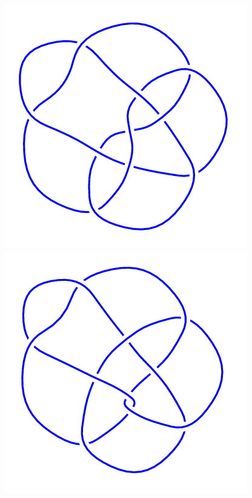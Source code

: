 \begin{figure}[H]
\begin{minipage}[b]{.18\linewidth}
	\end{minipage}
	\begin{minipage}[b]{.18\linewidth}
		\centering
		\includegraphics[width=\linewidth]{../data/10_164.png}
	\end{minipage}
	\begin{minipage}[b]{.18\linewidth}
		\centering
		\includegraphics[width=\linewidth]{../data/10_165.png}
	\end{minipage}
\end{figure}